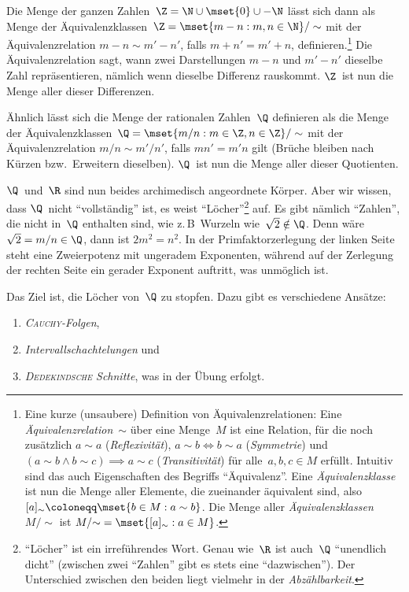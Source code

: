 \documentclass[a4paper]{article}
\begin{document}
Die Menge der ganzen Zahlen~$\Z = \N \cup \mset{0} \cup -\N$ lässt sich dann als Menge der Äquivalenzklassen~$\Z = \mset{m-n : m, n \in \N} / \sim$ mit der Äquivalenzrelation $m-n \sim m'-n'$, falls $m+n' = m'+n$, definieren.\footnote{Eine kurze (unsaubere) Definition von Äquivalenzrelationen: Eine \emph{Äquivalenzrelation}~$\sim$ über eine Menge~$M$ ist eine Relation, für die noch zusätzlich $a \sim a$ (\emph{Reflexivität}), $a \sim b \iff b \sim a$ (\emph{Symmetrie}) und $(a \sim b \wedge b \sim c) \implies a \sim c$ (\emph{Transitivität}) für alle~$a, b, c \in M$ erfüllt. Intuitiv sind das auch Eigenschaften des Begriffs "`Äquivalenz"'. Eine \emph{Äquivalenzklasse} ist nun die Menge aller Elemente, die zueinander äquivalent sind, also $[a]_\sim \coloneqq \mset{b \in M : a \sim b}$. Die Menge aller \emph{Äquivalenzklassen}~$M/{\sim}$ ist $M/{\sim} = \mset{[a]_\sim : a \in M}$.} Die Äquivalenzrelation sagt, wann zwei Darstellungen $m-n$ und $m'-n'$ dieselbe Zahl repräsentieren, nämlich wenn dieselbe Differenz rauskommt. $\Z$~ist nun die Menge aller dieser Differenzen.

Ähnlich lässt sich die Menge der rationalen Zahlen~$\Q$ definieren als die Menge der Äquivalenzklassen~$\Q = \mset{m/n : m \in \Z, n \in \Z} / \sim$ mit der Äquivalenzrelation $m/n \sim m'/n'$, falls $mn' = m'n$ gilt (Brüche bleiben nach Kürzen bzw.\ Erweitern dieselben). $\Q$~ist nun die Menge aller dieser Quotienten.

$\Q$~und~$\R$ sind nun beides archimedisch angeordnete Körper. Aber wir wissen, dass $\Q$~nicht "`vollständig"' ist, es weist "`Löcher"'\footnote{"`Löcher"' ist ein irreführendes Wort. Genau wie~$\R$ ist auch~$\Q$ "`unendlich dicht"' (zwischen zwei "`Zahlen"' gibt es stets eine "`dazwischen"'). Der Unterschied zwischen den beiden liegt vielmehr in der \emph{Abzählbarkeit}.} auf. Es gibt nämlich "`Zahlen"', die nicht in~$\Q$ enthalten sind, wie z.\,B\ Wurzeln wie~$\sqrt{2} \notin \Q$. Denn wäre $\sqrt{2} = m/n \in \Q$, dann ist $2m^2 = n^2$. In der Primfaktorzerlegung der linken Seite steht eine Zweierpotenz mit ungeradem Exponenten, während auf der Zerlegung der rechten Seite ein gerader Exponent auftritt, was unmöglich ist.

Das Ziel ist, die Löcher von~$\Q$ zu stopfen. Dazu gibt es verschiedene Ansätze:
\begin{enumerate}
    \item \emph{\textsc{Cauchy}-Folgen},
    \item \emph{Intervallschachtelungen} und
    \item \emph{\textsc{Dedekindsche} Schnitte}, was in der Übung erfolgt.
\end{enumerate}
\end{document}
